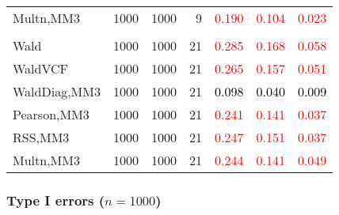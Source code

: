 \documentclass[
]{article}
\begin{document}
\begin{table}[H]
{\begin{tabular}[t]{lrrrrrr}
\hspace{1em}Multn,MM3 & 1000 & 1000 & 9 & \textcolor{red}{0.190} & \textcolor{red}{0.104} & \textcolor{red}{0.023}\\
\addlinespace[0.3em]
\multicolumn{7}{l}{\textbf{3F 15V}}\\
\hspace{1em}Wald & 1000 & 1000 & 21 & \textcolor{red}{0.285} & \textcolor{red}{0.168} & \textcolor{red}{0.058}\\
\hspace{1em}WaldVCF & 1000 & 1000 & 21 & \textcolor{red}{0.265} & \textcolor{red}{0.157} & \textcolor{red}{0.051}\\
\hspace{1em}WaldDiag,MM3 & 1000 & 1000 & 21 & \textcolor{black}{0.098} & \textcolor{black}{0.040} & \textcolor{black}{0.009}\\
\hspace{1em}Pearson,MM3 & 1000 & 1000 & 21 & \textcolor{red}{0.241} & \textcolor{red}{0.141} & \textcolor{red}{0.037}\\
\hspace{1em}RSS,MM3 & 1000 & 1000 & 21 & \textcolor{red}{0.247} & \textcolor{red}{0.151} & \textcolor{red}{0.037}\\
\hspace{1em}Multn,MM3 & 1000 & 1000 & 21 & \textcolor{red}{0.244} & \textcolor{red}{0.141} & \textcolor{red}{0.049}\\
\bottomrule
\end{tabular}}
\endgroup{}
\end{table}

\hypertarget{type-i-errors-n1000-1}{%
\subsubsection{\texorpdfstring{Type I errors
(\(n=1000\))}{Type I errors (n=1000)}}\label{type-i-errors-n1000-1}}
\end{document}
